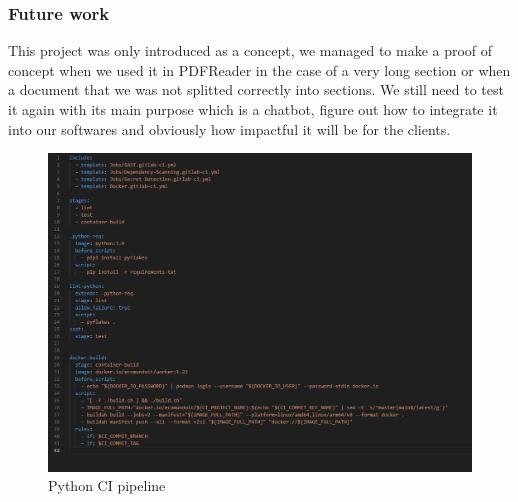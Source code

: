\documentclass[a4paper,12pt,twoside]{report}
\begin{document}
\subsubsection{Future work}
This project was only introduced as a concept, we managed to make a proof of concept when we used it in PDFReader in the case of a very long section or when a document that we was not splitted correctly into sections. We still need to test it again with its main purpose which is a chatbot, figure out how to integrate it into our softwares and obviously how impactful it will be for the clients.





\appendix
\appendixpage
\addappheadtotoc

\begin{figure}[H]
		\includegraphics[width=\textwidth, keepaspectratio ]{images/python-yaml}
	\caption[Python CI pipeline]{Python CI pipeline}
\label{Python Pipeline}
\end{figure}	
\end{document}
